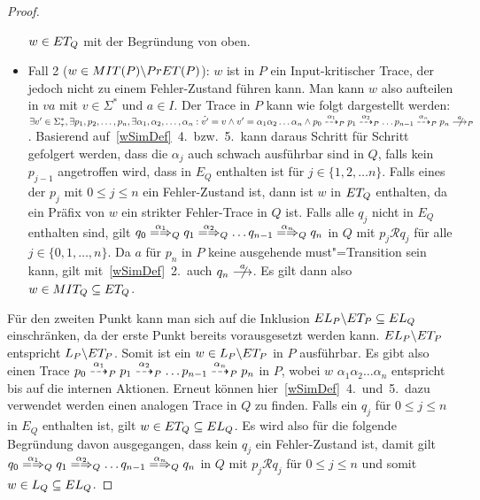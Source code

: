 \begin{proof}
\begin{itemize}
      $w\in ET _Q$ mit der Begründung von oben.
    \item Fall 2 ($w\in MIT (P)\backslash PrET (P)$): $w$ ist in $P$ ein
      Input-kritischer Trace, der jedoch nicht zu einem Fehler-Zustand führen
      kann. Man kann $w$ also aufteilen in $va$ mit $v\in \Sigma ^*$ und $a\in
      I$. Der Trace in $P$ kann wie folgt dargestellt werden: $\exists v'\in
      \Sigma _{\tau}^*, \exists p_1, p_2, \dots , p_n, \exists \alpha _1,
      \alpha _2, \dots , \alpha _n: \hat{v'}=v \land v'=\alpha _1 \alpha _2
      \dots \alpha _n \land p_0 \may[\alpha _1]_P p_1 \may[\alpha _2]_P \dots
      p_{n-1} \may[\alpha _n]_P p_n \nmust[a]_P$. Basierend
      auf~\ref{wSimDef}~4.\ bzw.~5.\ kann daraus Schritt für Schritt gefolgert
      werden, dass die $\alpha _j$ auch schwach ausführbar sind in $Q$, falls
      kein $p_{j-1}$ angetroffen wird, dass in $E_Q$ enthalten ist für $j\in
      \{1,2,\dots n\}$. Falls eines der $p_j$ mit $0 \leq j \leq n$ ein
      Fehler-Zustand ist, dann ist $w$ in $ET _Q$ enthalten, da ein Präfix von
      $w$ ein strikter Fehler-Trace in $Q$ ist. Falls alle $q_j$ nicht in $E_Q$
      enthalten sind, gilt $q_0 \weakmay[\alpha _1]_Q q_1 \weakmay[\alpha _2]_Q
      \dots q_{n-1} \weakmay[\alpha _n]_Q q_n$ in $Q$ mit $p_j \mathcal{R} q_j$
      für alle $j\in \{0,1, \dots , n\}$. Da $a$ für $p_n$ in $P$ keine
      ausgehende must"=Transition sein kann, gilt mit~\ref{wSimDef}~2.\ auch
      $q_n \nmust[a]$. Es gilt dann also $w\in MIT _Q \subseteq ET _Q$.
  \end{itemize}
  Für den zweiten Punkt kann man sich auf die Inklusion $EL _P\backslash ET _P
  \subseteq EL _Q$ einschränken, da der erste Punkt bereits vorausgesetzt
  werden kann. $EL _P\backslash ET _P$ entspricht $L _P\backslash ET _P$.
  Somit ist ein $w\in L_P\backslash ET _P$ in $P$ ausführbar. Es gibt also
  einen Trace $p_0 \may[\alpha _1]_P p_1 \may[\alpha _2]_P \dots p_{n-1}
  \may[\alpha _n]_P p_n$ in $P$, wobei $w$ $\alpha _1\alpha _2 \dots \alpha _n$
  entspricht bis auf die internen Aktionen. Erneut können
  hier~\ref{wSimDef}~4.\ und~5.\ dazu verwendet werden einen analogen Trace in
  $Q$ zu finden. Falls ein $q_j$ für $0 \leq j \leq n$ in $E_Q$ enthalten ist,
  gilt $w\in ET _Q \subseteq EL _Q$. Es wird also für die folgende Begründung
  davon ausgegangen, dass kein $q_j$ ein Fehler-Zustand ist, damit gilt $q_0
  \weakmay[\alpha _1]_Q q_1 \weakmay[\alpha _2]_Q \dots q_{n-1} \weakmay[\alpha
  _n]_Q q_n$ in $Q$ mit $p_j \mathcal{R} q_j$ für $0 \leq j \leq n$ und somit
  $w\in L _Q\subseteq EL _Q$.


\end{proof}
